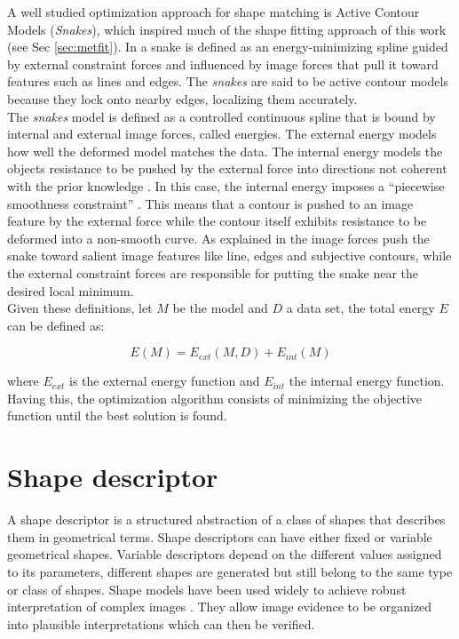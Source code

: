 A well studied optimization approach for shape matching is
Active Contour Models (\emph{Snakes}),  which inspired much 
of the shape fitting approach of this work 
(see Sec \ref{sec:metfit}). In \cite{snakes} a snake is defined 
as an energy-minimizing spline guided by external constraint
forces and influenced by image forces that pull it toward 
features such as lines and edges. The \emph{snakes} are said to
be active contour models because they lock onto nearby edges,
localizing them accurately.\\
The \emph{snakes} model is defined as a controlled continuous spline that is bound
by internal and external image forces, called energies. The external energy models how well
the deformed model matches the data. The internal energy models
the objects resistance to be pushed by the external force into directions not coherent
with the prior knowledge \cite{deformable}. In this case, the internal energy  imposes 
a ``piecewise smoothness constraint'' \cite{snakes}. This means that a contour is
pushed to an image feature by the external force while the contour itself exhibits resistance
to be deformed into a non-smooth curve. As explained in \cite{deformable} the image forces push the snake toward
salient image features like line, edges and subjective contours, while the external constraint forces
are responsible for putting the snake near the desired local minimum.\\

Given these definitions, let $M$ be the model and $D$ a data set, 
the total energy $E$ can be defined as:

$$E(M) = E_{ext}(M,D) + E_{int}(M)$$

where $E_{ext}$ is the external energy function and $E_{int}$ the 
internal energy function. 
Having this, the optimization algorithm consists of minimizing the objective
function until the best solution is found.


\section{Shape descriptor}
\label{sec:shapedesc}

A shape descriptor is a structured abstraction of a class
of shapes that describes them in geometrical terms.
Shape descriptors can have either fixed or variable
geometrical shapes. Variable descriptors depend on the different values assigned to its
parameters, different shapes are generated but still belong to the same type or class of shapes.
Shape models have been used widely to achieve robust interpretation of complex
images \cite{wormparam}. They allow image evidence to be organized into plausible interpretations
which can then be verified.\\

